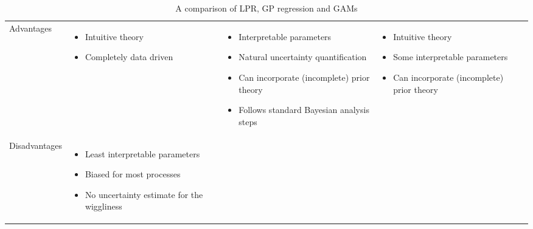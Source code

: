 \documentclass[man, floatsintext]{apa7}
\begin{document}
\begin{table}[htbp]
  \begin{center}
    \begin{threeparttable}
      \caption{A comparison of LPR, GP regression and GAMs}
      \label{tab:meth_sum}
      \begin{singlespace}
        \begin{tabularx}{\linewidth}
          {>{\raggedright}s
            >{\raggedright}X
            >{\raggedright}X
            >{\raggedright\arraybackslash}X}
          \toprule
                                                            &
                                     &
                                      &
          \\
          \midrule
          Advantages                                        &
          \begin{itemize}
            \item Intuitive theory
            \item Completely data driven
          \end{itemize}                      &
          \begin{itemize}
            \item Interpretable parameters
            \item Natural uncertainty quantification
            \item Can incorporate (incomplete) prior theory
            \item Follows standard Bayesian analysis steps
          \end{itemize}   &
          \begin{itemize}
            \item Intuitive theory
            \item Some interpretable parameters
            \item Can incorporate (incomplete) prior theory
          \end{itemize}
          \\ \midrule
          Disadvantages                                     &
          \begin{itemize}
            \item Least interpretable parameters
            \item Biased for most processes
            \item No uncertainty estimate for the wiggliness
          \end{itemize}  &

\end{tabularx}
\end{singlespace}
\end{threeparttable}
\end{center}
\end{table}
\end{document}

